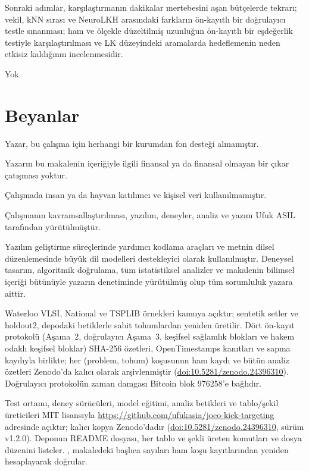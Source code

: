 \documentclass[pdflatex,sn-basic]{sn-jnl}
\begin{document}
Sonraki adımlar, karşılaştırmanın dakikalar mertebesini aşan bütçelerde tekrarı; vekil, kNN sırası
ve NeuroLKH arasındaki farkların ön-kayıtlı bir doğrulayıcı testle sınanması; ham ve ölçekle
düzeltilmiş uzunluğun ön-kayıtlı bir eşdeğerlik testiyle karşılaştırılması ve LK düzeyindeki
aramalarda hedeflemenin neden etkisiz kaldığının incelenmesidir.

\backmatter

Yok.

\section*{Beyanlar}

Yazar, bu çalışma için herhangi bir kurumdan fon desteği almamıştır.

Yazarın bu makalenin içeriğiyle ilgili finansal ya da finansal olmayan bir çıkar çatışması
yoktur.

Çalışmada insan ya da hayvan katılımcı ve kişisel veri kullanılmamıştır.

Çalışmanın kavramsallaştırılması, yazılım, deneyler, analiz ve yazım Ufuk ASIL tarafından
yürütülmüştür.

Yazılım geliştirme süreçlerinde yardımcı kodlama araçları ve metnin dilsel düzenlemesinde büyük
dil modelleri destekleyici olarak kullanılmıştır. Deneysel tasarım, algoritmik doğrulama, tüm
istatistiksel analizler ve makalenin bilimsel içeriği bütünüyle yazarın denetiminde yürütülmüş
olup tüm sorumluluk yazara aittir.

Waterloo VLSI, National ve TSPLIB örnekleri kamuya açıktır; sentetik setler ve holdout2, depodaki
betiklerle sabit tohumlardan yeniden üretilir. Dört ön-kayıt protokolü (Aşama~2, doğrulayıcı Aşama~3,
keşifsel sağlamlık blokları ve hakem odaklı keşifsel bloklar) SHA-256 özetleri, OpenTimestamps kanıtları ve sapma kaydıyla
birlikte; her (problem, tohum) koşusunun ham kaydı ve bütün analiz özetleri Zenodo'da kalıcı olarak
arşivlenmiştir (\href{https://doi.org/10.5281/zenodo.24396310}{doi:10.5281/zenodo.24396310}).
Doğrulayıcı protokolün zaman damgası Bitcoin blok 976258'e bağlıdır.

Test ortamı, deney sürücüleri, model eğitimi, analiz betikleri ve tablo/şekil üreticileri MIT
lisansıyla \url{https://github.com/ufukasia/joco-kick-targeting} adresinde açıktır; kalıcı kopya
Zenodo'dadır (\href{https://doi.org/10.5281/zenodo.24396310}{doi:10.5281/zenodo.24396310}, sürüm
v1.2.0). Deponun README dosyası, her tablo ve şekli üreten komutları ve dosya düzenini listeler.
, makaledeki başlıca sayıları ham koşu kayıtlarından yeniden
hesaplayarak doğrular.


\end{document}
